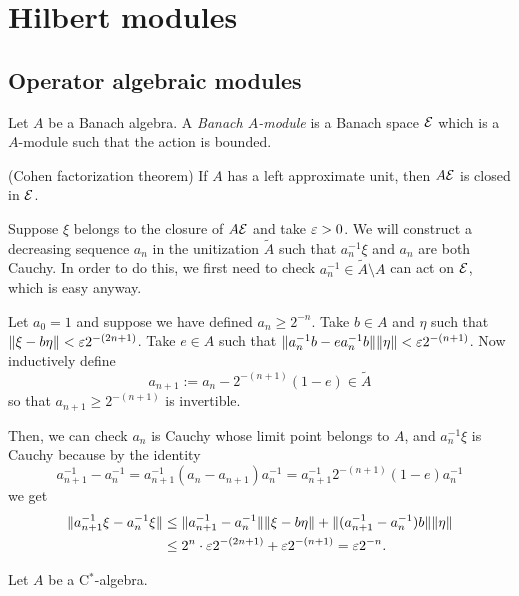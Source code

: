 \documentclass{../../large}
\begin{document}
\chapter{Hilbert modules}

\section{Operator algebraic modules}

\begin{prb}
Let $A$ be a Banach algebra.
A \emph{Banach $A$-module} is a Banach space $\mathcal{E}$ which is a $A$-module such that the action is bounded.
\begin{parts}
\item (Cohen factorization theorem) If $A$ has a left approximate unit, then $A\mathcal{E}$ is closed in $\mathcal{E}$.
\end{parts}
\end{prb}
\begin{pf}
Suppose $\xi$ belongs to the closure of $A\mathcal{E}$ and take $\varepsilon>0$.
We will construct a decreasing sequence $a_n$ in the unitization $\tilde A$ such that $a_n^{-1}\xi$ and $a_n$ are both Cauchy.
In order to do this, we first need to check $a_n^{-1}\in\tilde A\setminus A$ can act on $\mathcal{E}$, which is easy anyway.

Let $a_0=1$ and suppose we have defined $a_n\ge 2^{-n}$.
Take $b\in A$ and $\eta$ such that $\|\xi-b\eta\|<\varepsilon2^{-(2n+1)}$.
Take $e\in A$ such that $\|a_n^{-1}b-ea_n^{-1}b\|\|\eta\|<\varepsilon2^{-(n+1)}$.
Now inductively define
\[a_{n+1}:=a_n-2^{-(n+1)}(1-e)\in\tilde A\]
so that $a_{n+1}\ge2^{-(n+1)}$ is invertible.

Then, we can check $a_n$ is Cauchy whose limit point belongs to $A$, and
$a_n^{-1}\xi$ is Cauchy because by the identity
\[a_{n+1}^{-1}-a_n^{-1}=a_{n+1}^{-1}(a_n-a_{n+1})a_n^{-1}=a_{n+1}^{-1}2^{-(n+1)}(1-e)a_n^{-1}\]
we get
\begin{align*}
\|a_{n+1}^{-1}\xi-a_n^{-1}\xi\|
&\le\|a_{n+1}^{-1}-a_n^{-1}\|\|\xi-b\eta\|+\|(a_{n+1}^{-1}-a_n^{-1})b\|\|\eta\|\\
&\le2^n\cdot\varepsilon2^{-(2n+1)}+\varepsilon2^{-(n+1)}=\varepsilon2^{-n}.
\end{align*}
\end{pf}

\begin{prb}
Let $A$ be a C$^*$-algebra.
\end{prb}
\end{document}
